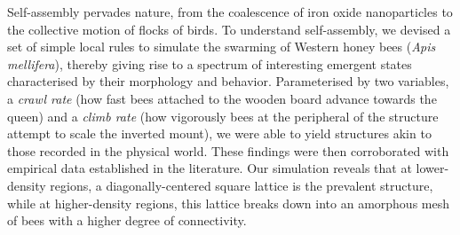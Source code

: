 \documentclass{article}
\begin{document}
Self-assembly pervades nature, from the coalescence of iron oxide nanoparticles
to the collective motion of flocks of birds. To understand self-assembly, we
devised a set of simple local rules to simulate the swarming of Western
honey bees (\textit{Apis mellifera}), thereby giving rise to a spectrum of
interesting emergent states characterised by their morphology and behavior.
Parameterised by two variables, a \textit{crawl rate} (how fast bees attached
to the wooden board advance towards the queen) and a \textit{climb rate} (how
vigorously bees at the peripheral of the structure attempt to scale the inverted
mount), we were able to yield structures akin to those recorded in the
physical world. These findings were then corroborated with empirical data established
in the literature. Our simulation reveals that at lower-density
regions, a diagonally-centered square lattice is the prevalent structure, while
at higher-density regions, this lattice breaks down into an amorphous mesh
of bees with a higher degree of connectivity.
\end{document}
